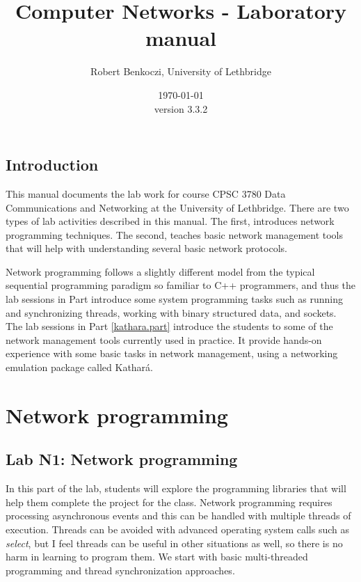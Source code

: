 \documentclass[12pt]{book}
\title{Computer Networks - Laboratory manual}    %
\author{Robert Benkoczi, University of Lethbridge}    %
\date{\today\\ version 3.3.2}  %
\newcommand{\kathara}{Kathar\'a}
\begin{document}
\frontmatter                            %
\maketitle    
\doclicenseThis                      
\tableofcontents                        %

\mainmatter %

\chapter{Introduction}

This manual documents the lab work for course CPSC 3780 Data Communications and Networking at the University of Lethbridge. There are two types of lab activities described in this manual. The first, introduces network programming techniques. The second, teaches basic network management tools that will help with understanding several basic network protocols.

Network programming follows a slightly different model from the typical sequential programming paradigm so familiar to C++ programmers, and thus the lab sessions in Part \ref{cpp.part} introduce some system programming tasks such as running and synchronizing threads, working with binary structured data, and sockets.
The lab sessions in Part \ref{kathara.part} introduce the students to some of the network management tools currently used in practice. It provide hands-on experience with some basic tasks in network management, using a networking emulation package called \kathara.


\part{Network programming}\label{cpp.part}

\chapter{Lab N1: Network programming}

In this part of the lab, students will explore the programming libraries that will help them complete the project for the class. Network programming requires processing asynchronous events and this can be handled with multiple threads of execution. Threads can be avoided with advanced operating system calls such as \emph{select}, but I feel threads can be useful in other situations as well, so there is no harm in learning to program them. We start with basic multi-threaded programming and thread synchronization approaches. 
\end{document}

